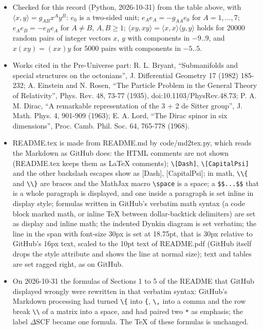 \documentclass[10pt]{article}
\begin{document}
\begin{itemize}
\item Checked for this record (Python, 2026-10-31) from the table above, with $\langle x,y\rangle = g_{AB}x^Ay^B$: $e_0$ is a two-sided unit; $e_Ae_A = -g_{AA}e_0$ for $A = 1, \dots, 7$; $e_Ae_B = -e_Be_A$ for $A \ne B$, $A, B \ge 1$; $\langle xy, xy\rangle = \langle x,x\rangle\langle y,y\rangle$ holds for 20000 random pairs of integer vectors $x$, $y$ with components in $-9..9$, and $x(xy) = (xx)y$ for 5000 pairs with components in $-5..5$.
\item Works cited in the Pre-Universe part: R. L. Bryant, ``Submanifolds and special structures on the octonians'', J. Differential Geometry 17 (1982) 185-232; A. Einstein and N. Rosen, ``The Particle Problem in the General Theory of Relativity'', Phys. Rev. 48, 73-77 (1935), doi:10.1103/PhysRev.48.73; P. A. M. Dirac, ``A remarkable representation of the 3 + 2 de Sitter group'', J. Math. Phys. 4, 901-909 (1963); E. A. Lord, ``The Dirac spinor in six dimensions'', Proc. Camb. Phil. Soc. 64, 765-778 (1968).
\item README.tex is made from README.md by code/md2tex.py, which reads the Markdown as GitHub does: the HTML comments are not shown (README.tex keeps them as LaTeX comments); \texttt{\textbackslash{}[Dash]}, \texttt{\textbackslash{}[CapitalPsi]} and the other backslash escapes show as [Dash], [CapitalPsi]; in math, \texttt{\textbackslash{}\textbackslash{}\{} and \texttt{\textbackslash{}\textbackslash{}\}} are braces and the MathJax macro \texttt{\textbackslash{}space} is a space; a \texttt{\$\$...\$\$} that is a whole paragraph is displayed, and one inside a paragraph is set inline in display style; formulas written in GitHub's verbatim math syntax (a code block marked math, or inline TeX between dollar-backtick delimiters) are set as display and inline math; the indented Dynkin diagram is set verbatim; the line in the span with font-size 30px is set at 18.75pt, that is 30px relative to GitHub's 16px text, scaled to the 10pt text of README.pdf (GitHub itself drops the style attribute and shows the line at normal size); text and tables are set ragged right, as on GitHub.
\item On 2026-10-31 the formulas of Sections 1 to 5 of the README that GitHub displayed wrongly were rewritten in that verbatim syntax: GitHub's Markdown processing had turned \texttt{\textbackslash{}\{} into \texttt{\{}, \texttt{\textbackslash{},} into a comma and the row break \texttt{\textbackslash{}\textbackslash{}} of a matrix into a space, and had paired two \texttt{*} as emphasis; the label $\Delta\mathrm{SCF}$ became one formula. The TeX of these formulas is unchanged.
\end{itemize}
\end{document}
